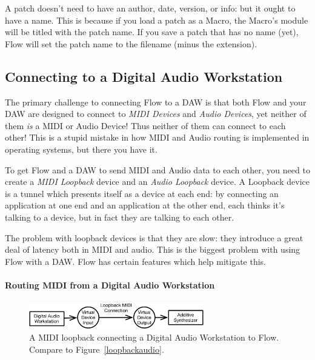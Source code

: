 \documentclass{article}
\newcommand\name{Flow}
\begin{document}
A patch doesn't need to have an author, date, version, or info: but it ought to have a name.  This is because if you load a patch as a Macro, the Macro's module will be titled with the patch name.  If you save a patch that has no name (yet), {\name} will set the patch name to the filename (minus the extension).

\subsection{Connecting to a Digital Audio Workstation}
\label{connecting}

The primary challenge to connecting Flow to a DAW is that both Flow and your DAW are designed to connect to {\it MIDI Devices} and {\it Audio Devices}, yet neither of them {\it is} a MIDI or Audio Device!  Thus neither of them can connect to each other!  This is a stupid mistake in how MIDI and Audio routing is implemented in operating systems, but there you have it.

To get Flow and a DAW to send MIDI and Audio data to each other, you need to create a {\it MIDI Loopback} device and an {\it Audio Loopback} device.  A Loopback device is a tunnel which presents itself as a device at each end: by connecting an application at one end and an application at the other end, each thinks it's talking to a device, but in fact they are talking to each other.

The problem with loopback devices is that they are slow: they introduce a great deal of latency both in MIDI and audio.  This is the biggest problem with using Flow with a DAW.  Flow has certain features which help mitigate this.  

\paragraph{Routing MIDI from a Digital Audio Workstation}

\begin{figure}
\vspace{-2em}
\begin{center}\includegraphics[width=3in]{loopbackmidi}\end{center}
\vspace{-1em}
\caption{A MIDI loopback connecting a Digital Audio Workstation to {\name}.  Compare to Figure~\ref{loopbackaudio}.}\label{loopbackmidi}
\end{figure}
\end{document}
